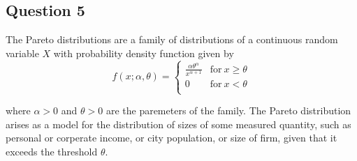 \documentclass{tufte-book}
\theoremstyle{mytheoremstyle}
\theoremstyle{mylemstyle}
\theoremstyle{mydefstyle}
\begin{document}
\subsection{Question 5}
The Pareto distributions are a family of distributions of a continuous random variable $X$ with probability density function given by
\[f(x;\alpha,\theta)=
\begin{cases}
      \frac{\alpha\theta^{\alpha}}{x^{\alpha+1}}  & \text{for}\ x \geq \theta\\
      0 & \text{for}\ x<\theta\\
\end{cases}
\]

where $\alpha > 0$ and $\theta > 0$ are the paremeters of the family.  The Pareto distribution arises as a model for the distribution of sizes  of some measured quantity, such as personal or corperate income, or city population, or size of firm, given that it exceeds the threshold $\theta$.
\end{document}

